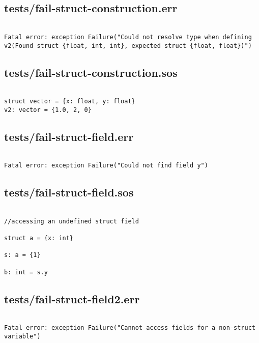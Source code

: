 \documentclass[main.tex]{subfiles}
\begin{document}
\subsection{tests/fail-struct-construction.err}

\begin{lstlisting}

Fatal error: exception Failure("Could not resolve type when defining v2(Found struct {float, int, int}, expected struct {float, float})")
\end{lstlisting}

\subsection{tests/fail-struct-construction.sos}

\begin{lstlisting}

struct vector = {x: float, y: float}
v2: vector = {1.0, 2, 0}
\end{lstlisting}

\subsection{tests/fail-struct-field.err}

\begin{lstlisting}

Fatal error: exception Failure("Could not find field y")
\end{lstlisting}

\subsection{tests/fail-struct-field.sos}

\begin{lstlisting}

//accessing an undefined struct field

struct a = {x: int}

s: a = {1}

b: int = s.y
\end{lstlisting}

\subsection{tests/fail-struct-field2.err}

\begin{lstlisting}

Fatal error: exception Failure("Cannot access fields for a non-struct variable")
\end{lstlisting}
\end{document}
